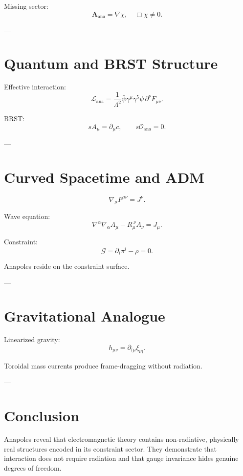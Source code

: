 \documentclass[11pt]{article}
\begin{document}
Missing sector:
\[
\mathbf{A}_{\text{ana}} = \nabla \chi, \quad \Box \chi \neq 0.
\]

---

\section{Quantum and BRST Structure}

Effective interaction:
\begin{equation}
\mathcal{L}_{\text{ana}} =
\frac{1}{\Lambda^2}
\bar{\psi}\gamma^\mu\gamma^5\psi\,\partial^\nu F_{\mu\nu}.
\end{equation}

BRST:
\[
s A_\mu = \partial_\mu c,
\qquad
s\mathcal{O}_{\text{ana}} = 0.
\]

---

\section{Curved Spacetime and ADM}

\begin{equation}
\nabla_\mu F^{\mu\nu} = J^\nu.
\end{equation}

Wave equation:
\[
\nabla^\alpha\nabla_\alpha A_\mu - R_\mu^{\ \nu} A_\nu = J_\mu.
\]

Constraint:
\[
\mathcal{G} = \partial_i \pi^i - \rho = 0.
\]

Anapoles reside on the constraint surface.

---

\section{Gravitational Analogue}

Linearized gravity:
\[
h_{\mu\nu} = \partial_{(\mu} \xi_{\nu)}.
\]

Toroidal mass currents produce frame-dragging without radiation.

---

\section{Conclusion}

Anapoles reveal that electromagnetic theory contains non-radiative, physically real structures encoded in its constraint sector.
They demonstrate that interaction does not require radiation and that gauge invariance hides genuine degrees of freedom.
\end{document}
